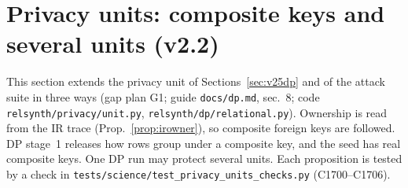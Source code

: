 \section{Privacy units: composite keys and several units (v2.2)}\label{sec:g1units}
\setcounter{savedpropunits}{\value{proposition}}
This section extends the privacy unit of Sections~\ref{sec:v25dp} and of the attack suite in three ways (gap plan G1; guide \texttt{docs/dp.md}, sec.~8; code \texttt{relsynth/privacy/unit.py}, \texttt{relsynth/dp/relational.py}). Ownership is read from the IR trace (Prop.~\ref{prop:irowner}), so composite foreign keys are followed. DP stage~1 releases how rows group under a composite key, and the seed has real composite keys. One DP run may protect several units. Each proposition is tested by a check in \texttt{tests/science/test\_privacy\_units\_checks.py} (C1700--C1706).

